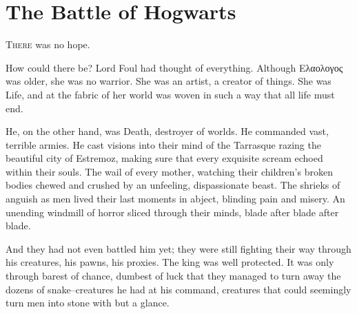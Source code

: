 \chapter{The Battle of Hogwarts}

\simpleline


\lettrine{T}{here} was no hope.

How could there be? Lord Foul had thought of everything. Although Ελαολογος was older, she was no warrior. She was an artist, a creator of things. She was Life, and at the fabric of her world was woven in such a way that all life must end.

He, on the other hand, was Death, destroyer of worlds. He commanded vast, terrible armies. He cast visions into their mind of the Tarrasque razing the beautiful city of Estremoz, making sure that every exquisite scream echoed within their souls. The wail of every mother, watching their children’s broken bodies chewed and crushed by an unfeeling, dispassionate beast. The shrieks of anguish as men lived their last moments in abject, blinding pain and misery. An unending windmill of horror sliced through their minds, blade after blade after blade.

And they had not even battled him yet; they were still fighting their way through his creatures, his pawns, his proxies. The king was well protected. It was only through barest of chance, dumbest of luck that they managed to turn away the dozens of snake\mbox{--}creatures he had at his command, creatures that could seemingly turn men into stone with but a glance.


